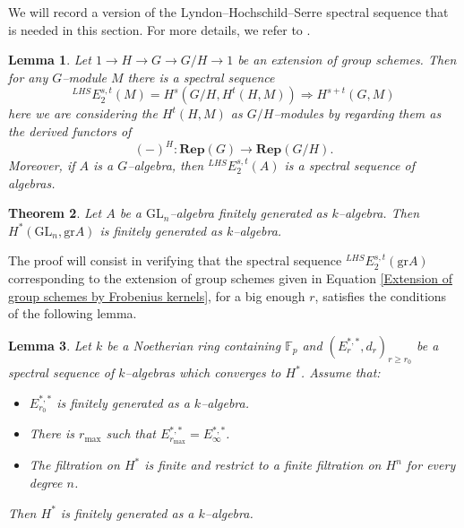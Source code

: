 \documentclass{article}
\theoremstyle{plain}
\newtheorem{Th}{Theorem}[section]
\newtheorem{Lemma}[Th]{Lemma}
\theoremstyle{definition}
\newcommand{\GL}{\mathrm{GL}}
\begin{document}
We will record a version of the Lyndon–Hochschild–Serre spectral sequence that is needed in this section. For more details, we refer to \cite[Section I.6.6]{jantzen2003representations}.


\begin{Lemma}
    Let $1\to H\to G\to G/H\to 1$ be an extension of group schemes. Then for any $G$--module $M$ there is a spectral sequence  
    \[
    {}^{LHS}E^{s,t}_2(M)=H^s(G/H,H^t(H,M))\Rightarrow H^{s+t}(G,M)
    \]
    here we are considering the $H^t(H,M)$ as $G/H$--modules by regarding them as the derived functors of 
    \[(-)^H\colon \mathbf{Rep}(G)\to \mathbf{Rep}(G/H).\]
    Moreover, if $A$ is a $G$--algebra, then ${}^{LHS}E^{s,t}_2(A)$ is a spectral sequence of algebras.  
\end{Lemma}



\begin{Th}\label{cohomology of grA is finitely generated}
    Let $A$ be a $\GL_n$--algebra finitely generated as $k$--algebra. Then $H^\ast(\GL_n,\mathrm{gr}A)$ is finitely generated as $k$--algebra.  
\end{Th}

The proof will consist in verifying that the spectral sequence ${}^{LHS}E^{s,t}_2(\mathrm{gr}A)$ corresponding to the extension of group schemes given in Equation \ref{Extension of group schemes by Frobenius kernels}, for a big enough $r$, satisfies the conditions of the following lemma. 
\begin{Lemma}\label{Lemma analysis of ss}
    Let $k$ be a Noetherian ring containing $\mathbb{F}_p$ and $(E^{\ast,\ast}_r,d_r)_{r\geq r_0}$ be a spectral sequence of $k$--algebras which converges to $H^\ast$. Assume that: 
    \begin{itemize}
        \item[(C1)] $E^{\ast,\ast}_{r_0}$ is finitely generated as a $k$--algebra.
        \item[(C2)] There is $r_\mathrm{max}$ such that $E^{\ast,\ast}_{r_\mathrm{max}}=E^{\ast,\ast}_\infty$.
        \item[(C3)] The filtration on $H^\ast$ is finite and restrict to a finite filtration on $H^n$ for every degree $n$.
    \end{itemize}
    Then $H^\ast$ is finitely generated as a $k$--algebra. 
\end{Lemma}
\end{document}
